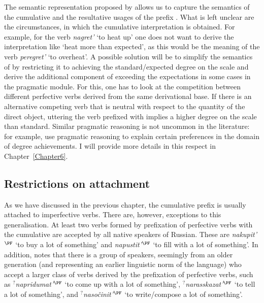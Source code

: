The semantic representation proposed by \citet{Kagan:book} allows us to capture the semantics of the cumulative and the resultative usages of the prefix . What is left unclear are the circumstances, in which the cumulative interpretation is obtained. For example, for the verb \textit{nagret'} `to heat up' one does not want to derive the interpretation like `heat more than expected', as this would be the meaning of the verb \textit{peregret'} `to overheat'. A possible solution will be to simplify the semantics of  by restricting it to achieving the standard/expected degree on the scale and derive the additional component of exceeding the expectations in some cases in the pragmatic module. For this, one has to look at the competition between different perfective verbs derived from the same derivational base. If there is an alternative competing verb that is neutral with respect to the quantity of the direct object, uttering the verb prefixed with  implies a higher degree on the scale than standard. Similar pragmatic reasoning is not uncommon in the literature: for example, \citet[21]{KennedyLevin:08} use pragmatic reasoning to explain certain preferences in the domain of degree achievements. I will provide more details in this respect in Chapter~\ref{Chapter6}.

\subsection{Restrictions on attachment}
As we have discussed in the previous chapter, the cumulative prefix  is usually attached to imperfective verbs. There are, however, exceptions to this generalisation. At least two verbs formed by prefixation of perfective verbs with the cumulative  are accepted by all native speakers of Russian. These are \textit{nakupit'}$^{\PF}$ `to buy a lot of something' and \textit{napustit'}$^{\PF}$ `to fill with a lot of something'. In addition, \citet{Tatevosov:13a} notes that there is a group of speakers, seemingly from an older generation (and representing an earlier linguistic norm of the language) who accept a larger class of verbs derived by the prefixation of perfective verbs, such as \textit{$^?$napridumat'}$^{\PF}$ `to come up with a lot of something', \textit{$^?$narasskazat'}$^{\PF}$ `to tell a lot of something', and \textit{$^?$naso\v{c}init'}$^{\PF}$ `to write/compose a lot of something'.

